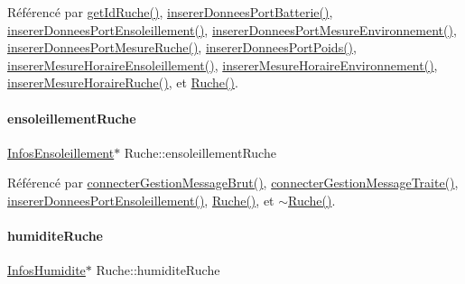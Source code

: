 Référencé par \hyperlink{class_ruche_a9f2de5ef29557ec7a53d5e22df34d164}{get\+Id\+Ruche()}, \hyperlink{class_ruche_a509367d6b2bcb7e6431fc1cc5ff606b5}{inserer\+Donnees\+Port\+Batterie()}, \hyperlink{class_ruche_ad21de5f7d48195be0658f52c55f34183}{inserer\+Donnees\+Port\+Ensoleillement()}, \hyperlink{class_ruche_a46c0f440f40a5125f2d579b481660457}{inserer\+Donnees\+Port\+Mesure\+Environnement()}, \hyperlink{class_ruche_aa61f6dd8b15e5242ef3a3bdd87cca4a3}{inserer\+Donnees\+Port\+Mesure\+Ruche()}, \hyperlink{class_ruche_a923f42fc4878a01f6102966a748e8f37}{inserer\+Donnees\+Port\+Poids()}, \hyperlink{class_ruche_a658234b9d96541d204b95b74556742b6}{inserer\+Mesure\+Horaire\+Ensoleillement()}, \hyperlink{class_ruche_ac52e79446c5629645e02e27d2a01e56c}{inserer\+Mesure\+Horaire\+Environnement()}, \hyperlink{class_ruche_a3a093c088d9c97f347394c8a681f7302}{inserer\+Mesure\+Horaire\+Ruche()}, et \hyperlink{class_ruche_a8b4ee3752d984c5acee93b990db7939a}{Ruche()}.

\mbox{\label{class_ruche_a197003ecff4f029885c7d38569a68d49}} 
\paragraph{\texorpdfstring{ensoleillement\+Ruche}{ensoleillementRuche}}
{\footnotesize\ttfamily \hyperlink{class_infos_ensoleillement}{Infos\+Ensoleillement}$\ast$ Ruche\+::ensoleillement\+Ruche\hspace{0.3cm}{\ttfamily [private]}}



Référencé par \hyperlink{class_ruche_a9c8e7e3b529676c6dda3d936370af00f}{connecter\+Gestion\+Message\+Brut()}, \hyperlink{class_ruche_a20ec8c6dc931218e5cf682050fe845d9}{connecter\+Gestion\+Message\+Traite()}, \hyperlink{class_ruche_ad21de5f7d48195be0658f52c55f34183}{inserer\+Donnees\+Port\+Ensoleillement()}, \hyperlink{class_ruche_a8b4ee3752d984c5acee93b990db7939a}{Ruche()}, et \hyperlink{class_ruche_ad3f950d0731f9801f06dd6ae09f2e5fa}{$\sim$\+Ruche()}.

\mbox{\label{class_ruche_acb380928928e693a1933c4cf607ddf80}} 
\paragraph{\texorpdfstring{humidite\+Ruche}{humiditeRuche}}
{\footnotesize\ttfamily \hyperlink{class_infos_humidite}{Infos\+Humidite}$\ast$ Ruche\+::humidite\+Ruche\hspace{0.3cm}{\ttfamily [private]}}



